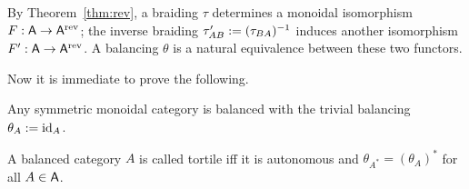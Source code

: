 By Theorem~\ref{thm:rev}, a braiding $\tau$ determines a monoidal isomorphism
$F: \mathsf{A} \to \mathsf{A}\sp{\text{rev}}$; the inverse braiding $\tau'_{AB} := (\tau_{BA})\sp{-1}$
induces another isomorphism $F': \mathsf{A} \to \mathsf{A}\sp{\text{rev}}$. A balancing $\theta$ is a
natural equivalence between these two functors.

Now it is immediate to prove the following.
\begin{proposition}
  Any symmetric monoidal category is balanced with the trivial
  balancing $\theta_A := \operatorname{id}_A$.
\end{proposition}

\begin{definition}
  A balanced category $A$ is called tortile iff it is autonomous and
    $\theta_{A^*} = (\theta_A)^*$ for all $A\in\mathsf{A}$.
\end{definition}




